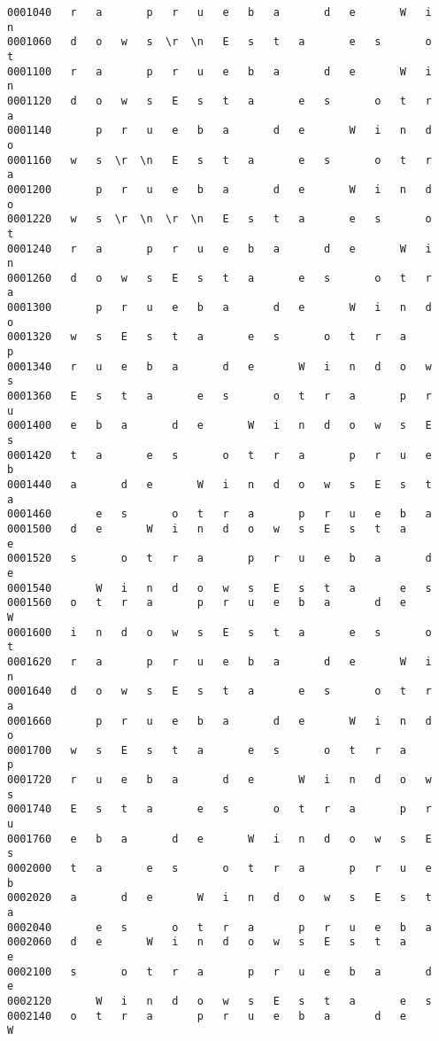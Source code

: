 \documentclass[a4paper,11pt]{article}
\begin{document}
\begin{itemize}
\begin{verbatim}
0001040   r   a       p   r   u   e   b   a       d   e       W   i   n
0001060   d   o   w   s  \r  \n   E   s   t   a       e   s       o   t
0001100   r   a       p   r   u   e   b   a       d   e       W   i   n
0001120   d   o   w   s   E   s   t   a       e   s       o   t   r   a
0001140       p   r   u   e   b   a       d   e       W   i   n   d   o
0001160   w   s  \r  \n   E   s   t   a       e   s       o   t   r   a
0001200       p   r   u   e   b   a       d   e       W   i   n   d   o
0001220   w   s  \r  \n  \r  \n   E   s   t   a       e   s       o   t
0001240   r   a       p   r   u   e   b   a       d   e       W   i   n
0001260   d   o   w   s   E   s   t   a       e   s       o   t   r   a
0001300       p   r   u   e   b   a       d   e       W   i   n   d   o
0001320   w   s   E   s   t   a       e   s       o   t   r   a       p
0001340   r   u   e   b   a       d   e       W   i   n   d   o   w   s
0001360   E   s   t   a       e   s       o   t   r   a       p   r   u
0001400   e   b   a       d   e       W   i   n   d   o   w   s   E   s
0001420   t   a       e   s       o   t   r   a       p   r   u   e   b
0001440   a       d   e       W   i   n   d   o   w   s   E   s   t   a
0001460       e   s       o   t   r   a       p   r   u   e   b   a    
0001500   d   e       W   i   n   d   o   w   s   E   s   t   a       e
0001520   s       o   t   r   a       p   r   u   e   b   a       d   e
0001540       W   i   n   d   o   w   s   E   s   t   a       e   s    
0001560   o   t   r   a       p   r   u   e   b   a       d   e       W
0001600   i   n   d   o   w   s   E   s   t   a       e   s       o   t
0001620   r   a       p   r   u   e   b   a       d   e       W   i   n
0001640   d   o   w   s   E   s   t   a       e   s       o   t   r   a
0001660       p   r   u   e   b   a       d   e       W   i   n   d   o
0001700   w   s   E   s   t   a       e   s       o   t   r   a       p
0001720   r   u   e   b   a       d   e       W   i   n   d   o   w   s
0001740   E   s   t   a       e   s       o   t   r   a       p   r   u
0001760   e   b   a       d   e       W   i   n   d   o   w   s   E   s
0002000   t   a       e   s       o   t   r   a       p   r   u   e   b
0002020   a       d   e       W   i   n   d   o   w   s   E   s   t   a
0002040       e   s       o   t   r   a       p   r   u   e   b   a    
0002060   d   e       W   i   n   d   o   w   s   E   s   t   a       e
0002100   s       o   t   r   a       p   r   u   e   b   a       d   e
0002120       W   i   n   d   o   w   s   E   s   t   a       e   s    
0002140   o   t   r   a       p   r   u   e   b   a       d   e       W

\end{verbatim}
\end{itemize}
\end{document}
